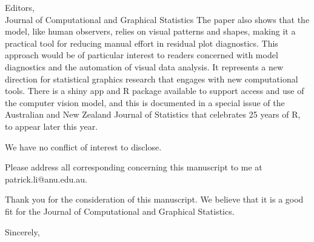 \documentclass[
  12pt,
  letterpaper]{letter}
\begin{document}
\begin{letter}{Editors,\\Journal of Computational and Graphical
Statistics}
The paper also shows that the model, like human observers, relies on
visual patterns and shapes, making it a practical tool for reducing
manual effort in residual plot diagnostics. This approach would be of
particular interest to readers concerned with model diagnostics and the
automation of visual data analysis. It represents a new direction for
statistical graphics research that engages with new computational tools.
There is a shiny app and R package available to support access and use
of the computer vision model, and this is documented in a special issue
of the Australian and New Zealand Journal of Statistics that celebrates
25 years of R, to appear later this year.

We have no conflict of interest to disclose.

Please address all corresponding concerning this manuscript to me at
patrick.li@anu.edu.au.

Thank you for the consideration of this manuscript. We believe that it
is a good fit for the Journal of Computational and Graphical Statistics.



\closing{Sincerely,}
\vfill
\end{letter}
\end{document}
